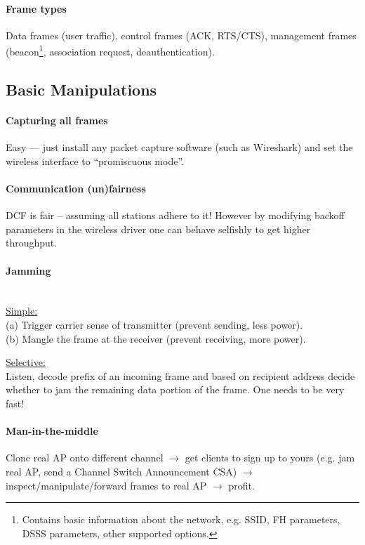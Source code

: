 \paragraph{Frame types}
Data frames (user traffic), control frames (ACK, RTS/CTS), management frames (beacon\footnote{Contains basic information about the network, e.g. SSID, FH parameters, DSSS parameters, other supported options.}, association request, deauthentication).


\subsection{Basic Manipulations}

\paragraph{Capturing all frames}
Easy --- just install any packet capture software (such as Wireshark) and set the wireless interface to ``promiscuous mode''.

\paragraph{Communication (un)fairness}
DCF is fair -- assuming all stations adhere to it!
However by modifying backoff parameters in the wireless driver one can behave selfishly to get higher throughput.

\paragraph{Jamming} \mbox{} \\
\underline{Simple:} \\
(a) Trigger carrier sense of transmitter (prevent sending, less power). \\
(b) Mangle the frame at the receiver (prevent receiving, more power).

\underline{Selective:} \\
Listen, decode prefix of an incoming frame and based on recipient address decide whether to jam the remaining data portion of the frame.
One needs to be very fast!

\paragraph{Man-in-the-middle}
Clone real AP onto different channel
$\rightarrow$ get clients to sign up to yours (e.g. jam real AP, send a Channel Switch Announcement CSA)
$\rightarrow$ inspect/manipulate/forward frames to real AP
$\rightarrow$ profit.


